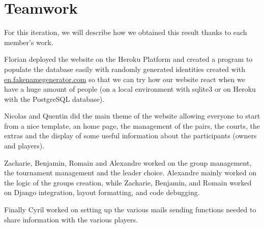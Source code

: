 \section{Teamwork}


For this iteration, we will describe how we obtained this result thanks to
each member's work. \newline

Florian deployed the website on the Heroku Platform and created a program
to populate the database easily with randomly generated identities created
with \url{en.fakenamegenerator.com} so that we can try how our website react
when we have a huge amount of people (on a local environment with sqlite3
or on Heroku with the PostgreSQL database). \newline

Nicolas and Quentin did the main theme of the website allowing everyone to
start from a nice template, an home page, the management of the pairs, the
courts, the extras and the display of some useful information about the
participants (owners and players). \newline

Zacharie, Benjamin, Romain and Alexandre worked on the group management,
the tournament management and the leader choice. Alexandre mainly worked on the logic of the groups creation, while Zacharie, Benjamin, and Romain worked on Django integration, layout formatting, and code debugging. \newline

Finally Cyril worked on setting up the various mails sending functions needed to share information with the various players. 